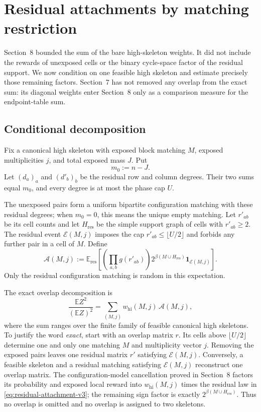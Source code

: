 \section{Residual attachments by matching restriction}
\label{sec:residual-attachments-v3}

Section~8 bounded the sum of the bare high-skeleton weights. It did not include
the rewards of unexposed cells or the binary cycle-space factor of the residual
support. We now condition on one feasible high skeleton and estimate precisely
those remaining factors. Section~7 has not removed any overlap from the exact
sum: its diagonal weights enter Section~8 only as a comparison measure for the
endpoint-table sum.

\subsection{Conditional decomposition}

Fix a canonical high skeleton with exposed block matching $M$, exposed
multiplicities $j$, and total exposed mass $J$. Put
\[
  m_0:=n-J.
\]
Let $(d_a)_a$ and $(d'_b)_b$ be the residual row and column degrees. Their two
sums equal $m_0$, and every degree is at most the phase cap $U$.

The unexposed pairs form a uniform bipartite configuration matching with these
residual degrees; when $m_0=0$, this means the unique empty matching. Let
$r'_{ab}$ be its cell counts and let $H_{\mathrm{res}}$ be the simple support
graph of cells with $r'_{ab}\ge2$. The residual event $\mathcal E(M,j)$ imposes
the cap $r'_{ab}\le\lfloor U/2\rfloor$ and forbids any further pair in a cell
of $M$. Define
\begin{equation}
  \mathcal A(M,j)
  :=
  \mathbb E_{\mathrm{res}}\!\left[
    \left(\prod_{a,b}g(r'_{ab})\right)
    2^{\beta(M\cup H_{\mathrm{res}})}
    \mathbf 1_{\mathcal E(M,j)}
  \right].
  \label{eq:residual-attachment-v3}
\end{equation}
Only the residual configuration matching is random in this expectation.

The exact overlap decomposition is
\begin{equation}
  \frac{\mathbb E Z^2}{(\mathbb E Z)^2}
  =
  \sum_{(M,j)}w_{\mathrm{hi}}(M,j)\,\mathcal A(M,j),
  \label{eq:exact-attachment-decomposition-v3}
\end{equation}
where the sum ranges over the finite family of feasible canonical high
skeletons. To justify the word \emph{exact}, start with an overlap matrix $r$.
Its cells above $\lfloor U/2\rfloor$ determine one and only one matching $M$
and multiplicity vector $j$. Removing the exposed pairs leaves one residual
matrix $r'$ satisfying $\mathcal E(M,j)$. Conversely, a feasible skeleton and
a residual matching satisfying $\mathcal E(M,j)$ reconstruct one overlap
matrix. The configuration-model cancellation proved in Section~8 factors its
probability and exposed local reward into $w_{\mathrm{hi}}(M,j)$ times the
residual law in \eqref{eq:residual-attachment-v3}; the remaining sign factor is
exactly $2^{\beta(M\cup H_{\mathrm{res}})}$. Thus no overlap is omitted and no
overlap is assigned to two skeletons.

